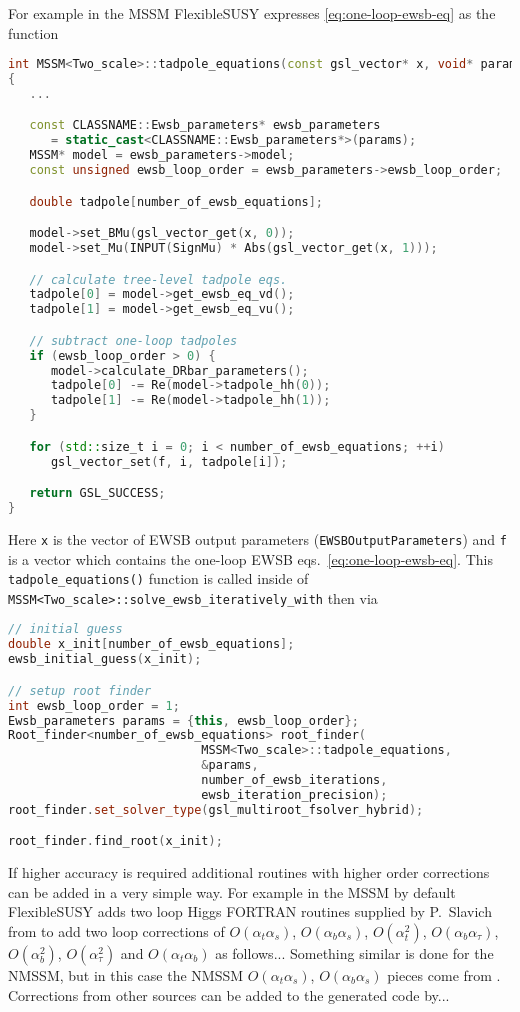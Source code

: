 \documentclass[final,3p,times,pdflatex]{elsarticle}
\newcommand{\fs}{FlexibleSUSY\xspace}
\newcommand{\code}[1]{\lstinline|#1|}  %
\def\at{\alpha_t}
\def\ab{\alpha_b}
\def\as{\alpha_s}
\def\atau{\alpha_{\tau}}
\def\oatab{O(\at\ab)}
\def\oatas{O(\at\as)}
\def\oabas{O(\ab\as)}
\def\oatq{O(\at^2)}
\def\oabq{O(\ab^2)}
\def\oatauq{O(\atau^2)}
\def\oabatau{O(\ab \atau)}
\begin{document}
For example in the MSSM \fs expresses \eqref{eq:one-loop-ewsb-eq} as
the function
%
\begin{lstlisting}[language=C++]
int MSSM<Two_scale>::tadpole_equations(const gsl_vector* x, void* params, gsl_vector* f)
{
   ...

   const CLASSNAME::Ewsb_parameters* ewsb_parameters
      = static_cast<CLASSNAME::Ewsb_parameters*>(params);
   MSSM* model = ewsb_parameters->model;
   const unsigned ewsb_loop_order = ewsb_parameters->ewsb_loop_order;

   double tadpole[number_of_ewsb_equations];

   model->set_BMu(gsl_vector_get(x, 0));
   model->set_Mu(INPUT(SignMu) * Abs(gsl_vector_get(x, 1)));

   // calculate tree-level tadpole eqs.
   tadpole[0] = model->get_ewsb_eq_vd();
   tadpole[1] = model->get_ewsb_eq_vu();

   // subtract one-loop tadpoles
   if (ewsb_loop_order > 0) {
      model->calculate_DRbar_parameters();
      tadpole[0] -= Re(model->tadpole_hh(0));
      tadpole[1] -= Re(model->tadpole_hh(1));
   }

   for (std::size_t i = 0; i < number_of_ewsb_equations; ++i)
      gsl_vector_set(f, i, tadpole[i]);

   return GSL_SUCCESS;
}
\end{lstlisting}
%
Here \code{x} is the vector of EWSB output parameters
(\code{EWSBOutputParameters}) and \code{f} is a vector which contains
the one-loop EWSB eqs.\ \eqref{eq:one-loop-ewsb-eq}.  This
\code{tadpole_equations()} function is called inside of
\code{MSSM<Two_scale>::solve_ewsb_iteratively_with} then via
%
\begin{lstlisting}[language=C++]
// initial guess
double x_init[number_of_ewsb_equations];
ewsb_initial_guess(x_init);

// setup root finder
int ewsb_loop_order = 1;
Ewsb_parameters params = {this, ewsb_loop_order};
Root_finder<number_of_ewsb_equations> root_finder(
                           MSSM<Two_scale>::tadpole_equations,
                           &params,
                           number_of_ewsb_iterations,
                           ewsb_iteration_precision);
root_finder.set_solver_type(gsl_multiroot_fsolver_hybrid);

root_finder.find_root(x_init);
\end{lstlisting}

If higher accuracy is required additional routines with higher order
corrections can be added in a very simple way.  For example in the
MSSM by default \fs adds two loop Higgs FORTRAN routines supplied by
P.~Slavich from \cite{slavich-degrassi} to add two loop corrections of
$\oatas$, $\oabas$, $\oatq$, $\oabatau$, $\oabq$, $\oatauq$ and
$\oatab$ as follows...  Something similar is done for the NMSSM, but
in this case the NMSSM $\oatas$, $\oabas$ pieces come from
\cite{Degrassi:2009yq}.  Corrections from other sources can be added
to the generated code by...
\end{document}
